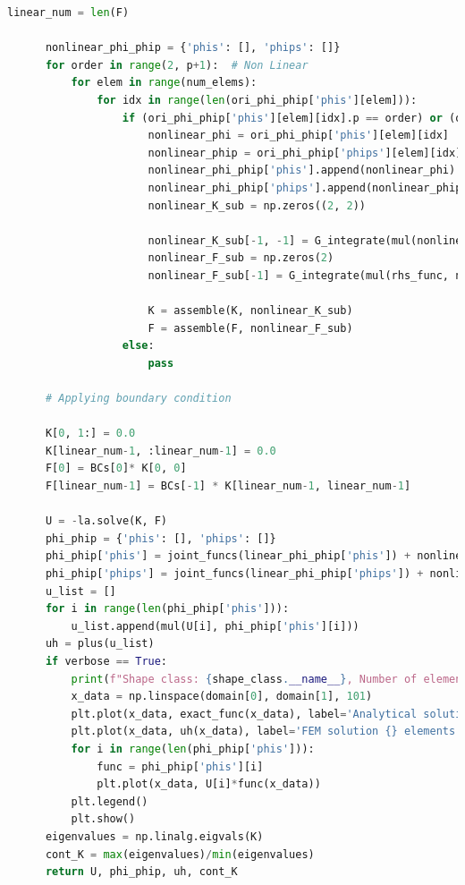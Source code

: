 \documentclass[twoside,twocolumn,10pt]{article}
\begin{document}
\begin{lstlisting}[language=Python, caption=Finite elements methods in 1-D main code]
      linear_num = len(F)
  
      nonlinear_phi_phip = {'phis': [], 'phips': []}
      for order in range(2, p+1):  # Non Linear
          for elem in range(num_elems):
              for idx in range(len(ori_phi_phip['phis'][elem])):
                  if (ori_phi_phip['phis'][elem][idx].p == order) or (ori_phi_phip['phips'][elem][idx].p == order):
                      nonlinear_phi = ori_phi_phip['phis'][elem][idx]
                      nonlinear_phip = ori_phi_phip['phips'][elem][idx]
                      nonlinear_phi_phip['phis'].append(nonlinear_phi)
                      nonlinear_phi_phip['phips'].append(nonlinear_phip)
                      nonlinear_K_sub = np.zeros((2, 2))
                      
                      nonlinear_K_sub[-1, -1] = G_integrate(mul(nonlinear_phip, nonlinear_phip),N=N, scale=nonlinear_phip.scale)
                      nonlinear_F_sub = np.zeros(2)
                      nonlinear_F_sub[-1] = G_integrate(mul(rhs_func, nonlinear_phi), N=N, scale=nonlinear_phi.scale)
  
                      K = assemble(K, nonlinear_K_sub)
                      F = assemble(F, nonlinear_F_sub)
                  else:
                      pass
                  
      # Applying boundary condition
  
      K[0, 1:] = 0.0 
      K[linear_num-1, :linear_num-1] = 0.0
      F[0] = BCs[0]* K[0, 0] 
      F[linear_num-1] = BCs[-1] * K[linear_num-1, linear_num-1]
  
      U = -la.solve(K, F)
      phi_phip = {'phis': [], 'phips': []}
      phi_phip['phis'] = joint_funcs(linear_phi_phip['phis']) + nonlinear_phi_phip['phis']
      phi_phip['phips'] = joint_funcs(linear_phi_phip['phips']) + nonlinear_phi_phip['phips']
      u_list = []
      for i in range(len(phi_phip['phis'])):
          u_list.append(mul(U[i], phi_phip['phis'][i]))
      uh = plus(u_list)
      if verbose == True:
          print(f"Shape class: {shape_class.__name__}, Number of elements: {num_elems}, Polynomial order:{p},  Domain: {domain}, Boundary conditions: {BCs}")
          x_data = np.linspace(domain[0], domain[1], 101)
          plt.plot(x_data, exact_func(x_data), label='Analytical solution')
          plt.plot(x_data, uh(x_data), label='FEM solution {} elements'.format(num_elems))
          for i in range(len(phi_phip['phis'])):
              func = phi_phip['phis'][i]
              plt.plot(x_data, U[i]*func(x_data))
          plt.legend()
          plt.show()
      eigenvalues = np.linalg.eigvals(K)
      cont_K = max(eigenvalues)/min(eigenvalues)
      return U, phi_phip, uh, cont_K
  
\end{lstlisting}
\end{document}
